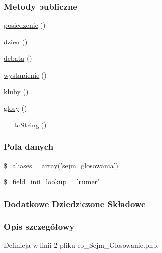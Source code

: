 \subsubsection*{Metody publiczne}
\begin{DoxyCompactItemize}
\item 
\hyperlink{classep___sejm___glosowanie_abfdc29f0533665ad6c77341c5fa3f7c7}{posiedzenie} ()
\item 
\hyperlink{classep___sejm___glosowanie_a211a968a9f3aa1e4a58516f8c344ec00}{dzien} ()
\item 
\hyperlink{classep___sejm___glosowanie_a7fe12606c5b0d87a6f1d26d2470a10c2}{debata} ()
\item 
\hyperlink{classep___sejm___glosowanie_aa051a476b68537f178e14ee797250288}{wystapienie} ()
\item 
\hyperlink{classep___sejm___glosowanie_aa8056e435aeb70114dcd8800fd64a142}{kluby} ()
\item 
\hyperlink{classep___sejm___glosowanie_aab9cc82c80e91ad71187a3c4a9999561}{glosy} ()
\item 
\hyperlink{classep___sejm___glosowanie_a7516ca30af0db3cdbf9a7739b48ce91d}{\-\_\-\-\_\-to\-String} ()
\end{DoxyCompactItemize}
\subsubsection*{Pola danych}
\begin{DoxyCompactItemize}
\item 
\hyperlink{classep___sejm___glosowanie_ab4e31d75f0bc5d512456911e5d01366b}{\$\-\_\-aliases} = array('sejm\-\_\-glosowania')
\item 
\hyperlink{classep___sejm___glosowanie_a4a4d54ae35428077a7c61ec8a5139af3}{\$\-\_\-field\-\_\-init\-\_\-lookup} = 'numer'
\end{DoxyCompactItemize}
\subsubsection*{Dodatkowe Dziedziczone Składowe}


\subsubsection{Opis szczegółowy}


Definicja w linii 2 pliku ep\-\_\-\-Sejm\-\_\-\-Glosowanie.\-php.



